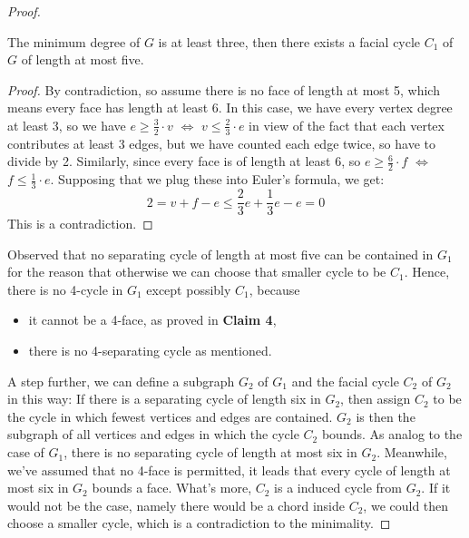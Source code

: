 \begin{proof}
\begin{lemma}
The minimum degree of $G$ is at least three, then there exists a facial cycle $C_1$ of $G$ of length at most five.
\end{lemma}

\begin{proof}
By contradiction, so assume there is no face of length at
most 5, which means every face has length at least 6. In this case, we have every vertex degree at least 3, so we have $e \geq \frac{3}{2} \cdot v$ $\Longleftrightarrow$ $v \leq \frac{2}{3} \cdot e$ in view of the fact that each vertex contributes at least 3 edges, but we have counted each edge twice, so have to divide by 2. Similarly, since every face is of length at least 6, so $e \geq \frac{6}{2} \cdot f$ $\Longleftrightarrow$ $f \leq \frac{1}{3} \cdot e$. Supposing that we plug these into Euler's formula, we get:
\begin{equation*}
    2 = v + f - e \leq \frac{2}{3}e + \frac{1}{3}e - e = 0
\end{equation*}
This is a contradiction.
\end{proof}

Observed that no separating cycle of length at most five can be contained in $G_1$ for the reason that otherwise we can choose that smaller cycle to be $C_1$. Hence, there is no 4-cycle in $G_1$ except possibly $C_1$, because 
\begin{itemize}
    \item it cannot be a 4-face, as proved in \textbf{Claim 4},
    \item there is no 4-separating cycle as mentioned.
\end{itemize}
A step further, we can define a subgraph $G_2$ of $G_1$ and the facial cycle $C_2$ of $G_2$ in this way: If there is a separating cycle of length six in $G_2$, then assign $C_2$ to be the cycle in which fewest vertices and edges are contained. $G_2$ is then the subgraph of all vertices and edges in which the cycle $C_2$ bounds. As analog to the case of $G_1$, there is no separating cycle of length at most six in $G_2$. Meanwhile, we've assumed that no 4-face is permitted, it leads that every cycle of length at most six in $G_2$ bounds a face. What's more, $C_2$ is a induced cycle from $G_2$. If it would not be the case, namely there would be a chord inside $C_2$, we could then choose a smaller cycle, which is a contradiction to the minimality. 


\end{proof}
